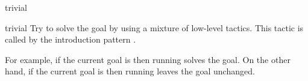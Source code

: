 \begin{tactic}{trivial}
  \begin{tsyntax}[empty]{trivial}
  Try to solve the goal by using a mixture of low-level tactics.
  This tactic is called by the introduction pattern \ec{//}.

  For example, if the current goal is
   then
  running 
  solves the goal.
  On the other hand, if the current goal is
   then
  running 
  leaves the goal unchanged.
  \end{tsyntax}
\end{tactic}
